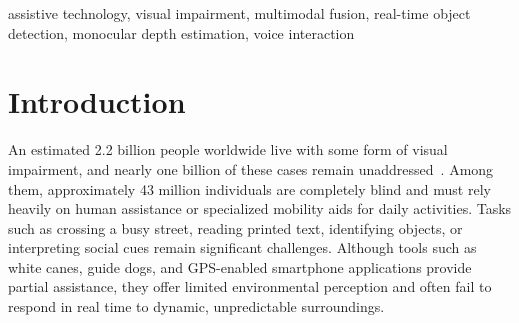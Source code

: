 \maketitle

\begin{abstract}
Blind and visually impaired individuals often struggle with navigation, reading, and social interaction, while existing assistive tools provide only partial support and frequently respond too slowly.


With the rapid advancement of artificial intelligence, computer vision, and real time multimodal systems, intelligent assistive technologies can significantly improve accessibility for blind and visually impaired individuals. However, many existing tools provide limited functionality and suffer from high response latency, restricting their effectiveness in real-world scenarios.

This paper presents Voice \& Vision Assistant (VVA), an open-source, real-time multimodal assistive system designed to enhance independent living. The proposed system integrates object detection, depth estimation, OCR-based text reading, braille recognition, sound localization, action recognition, and LLM driven visual question answering within a unified event-driven architecture. By processing visual and auditory inputs in real time and delivering low latency speech feedback, VVA provides immediate navigation guidance, environmental awareness, and interactive assistance.
\end{abstract}

\begin{IEEEkeywords}
assistive technology, visual impairment, multimodal fusion, real-time object detection, monocular depth estimation, voice interaction
\end{IEEEkeywords}

\section{Introduction}
\label{sec:intro}

An estimated 2.2 billion people worldwide live with some form of visual impairment, and nearly one billion of these cases remain unaddressed~\cite{fpubh2022_visual_impairment}. Among them, approximately 43 million individuals are completely blind and must rely heavily on human assistance or specialized mobility aids for daily activities. Tasks such as crossing a busy street, reading printed text, identifying objects, or interpreting social cues remain significant challenges. Although tools such as white canes, guide dogs, and GPS-enabled smartphone applications provide partial assistance, they offer limited environmental perception and often fail to respond in real time to dynamic, unpredictable surroundings.

